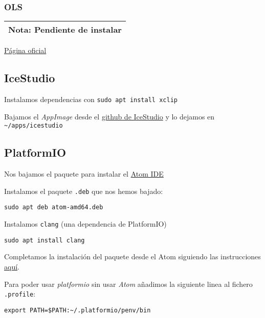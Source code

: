 \documentclass[
  12pt,
  spanish,
]{article}
\begin{document}
\hypertarget{ols}{%
\subsubsection{OLS}\label{ols}}

\begin{longtable}[]{@{}l@{}}
\toprule
\endhead
\textbf{Nota}: Pendiente de instalar\tabularnewline
\bottomrule
\end{longtable}

\href{https://www.lxtreme.nl/ols/}{Página oficial}

\hypertarget{icestudio}{%
\subsection{IceStudio}\label{icestudio}}

Instalamos dependencias con \texttt{sudo\ apt\ install\ xclip}

Bajamos el \emph{AppImage} desde el
\href{https://github.com/FPGAwars/icestudio}{github de IceStudio} y lo
dejamos en \texttt{\textasciitilde{}/apps/icestudio}

\hypertarget{platformio}{%
\subsection{PlatformIO}\label{platformio}}

Nos bajamos el paquete para instalar el \href{https://atom.io/}{Atom
IDE}

Instalamos el paquete \texttt{.deb} que nos hemos bajado:

\begin{verbatim}
sudo apt deb atom-amd64.deb
\end{verbatim}

Instalamos \texttt{clang} (una dependencia de PlatformIO)

\begin{verbatim}
sudo apt install clang
\end{verbatim}

Completamos la instalación del paquete desde el Atom siguiendo las
instrucciones
\href{https://platformio.org/get-started/ide?install=atom}{aquí}.

Para poder usar \emph{platformio} sin usar \emph{Atom} añadimos la
siguiente linea al fichero \texttt{.profile}:

\begin{verbatim}
export PATH=$PATH:~/.platformio/penv/bin
\end{verbatim}
\end{document}
